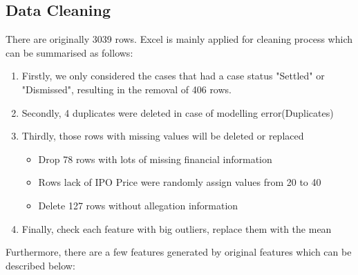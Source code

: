 \subsection{Data Cleaning}
There are originally 3039 rows. Excel is mainly applied for cleaning process which can be summarised as follows:
\begin{enumerate}
   \item Firstly, we only considered the cases that had a case status "Settled" or "Dismissed", resulting in the removal of 406 rows.
   \item Secondly, 4 duplicates were deleted in case of modelling error(Duplicates)
   \item Thirdly, those rows with missing values will be deleted or replaced 
   \begin{itemize}
     \item Drop 78 rows with lots of missing financial information 
     \item Rows lack of IPO Price were randomly assign values from 20 to 40 
     \item Delete 127 rows without allegation information 
   \end{itemize}
   \item Finally, check each feature with big outliers, replace them with the mean 
\end{enumerate}
Furthermore, there are a few features generated by original features which can be described below:
